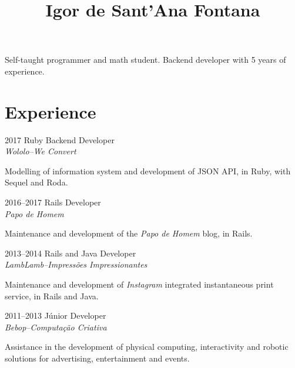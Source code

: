 \documentclass[a4paper,twoside]{simplecv}
\begin{document}


\title{Igor de Sant'Ana Fontana}

\maketitle

Self-taught programmer and math student. Backend developer with 5 years of
experience.

\section{Experience}

\begin{topic}
\item[2017] Ruby Backend Developer\\
	{\em\small Wololo--We Convert}

	Modelling of information system and development of JSON API, in Ruby,
	with Sequel and Roda.

\item[2016--2017] Rails Developer\\
	{\em\small Papo de Homem}

	Maintenance and development of the \emph{Papo de Homem} blog, in Rails.

\item[2013--2014] Rails and Java Developer\\
	{\em\small LambLamb--Impressões Impressionantes}

	Maintenance and development of \emph{Instagram} integrated
	instantaneous print service, in Rails and Java.

\item[2011--2013] Júnior Developer\\
	{\em\small Bebop--Computação Criativa}

	Assistance in the development of physical computing, interactivity and
	robotic solutions for advertising, entertainment and events.
\end{topic}
\end{document}
